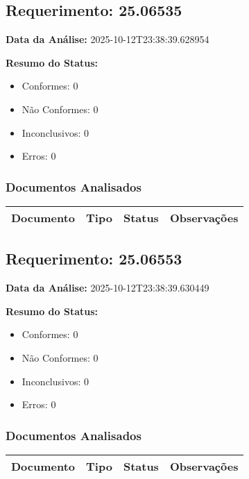 \documentclass[12pt,a4paper]{article}
\begin{document}
\subsection{Requerimento: 25.06535}

\textbf{Data da Análise:} 2025-10-12T23:38:39.628954

\textbf{Resumo do Status:}
\begin{itemize}
    \item Conformes: 0
    \item Não Conformes: 0
    \item Inconclusivos: 0
    \item Erros: 0
\end{itemize}

\subsubsection{Documentos Analisados}

\begin{longtable}{|p{4cm}|p{2cm}|p{2cm}|p{6cm}|}
\hline
\textbf{Documento} & \textbf{Tipo} & \textbf{Status} & \textbf{Observações} \\
\hline
\endhead
\end{longtable}


\subsection{Requerimento: 25.06553}

\textbf{Data da Análise:} 2025-10-12T23:38:39.630449

\textbf{Resumo do Status:}
\begin{itemize}
    \item Conformes: 0
    \item Não Conformes: 0
    \item Inconclusivos: 0
    \item Erros: 0
\end{itemize}

\subsubsection{Documentos Analisados}

\begin{longtable}{|p{4cm}|p{2cm}|p{2cm}|p{6cm}|}
\hline
\textbf{Documento} & \textbf{Tipo} & \textbf{Status} & \textbf{Observações} \\
\hline
\endhead
\end{longtable}
\end{document}
